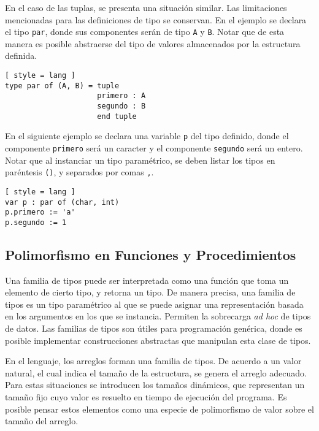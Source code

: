 En el caso de las tuplas, se presenta una situación similar.
Las limitaciones mencionadas para las definiciones de tipo se conservan.
En el ejemplo se declara el tipo \lstinline[style = lang]{par}, donde sus componentes serán de tipo \lstinline[style = lang]{A} y \lstinline[style = lang]{B}.
Notar que de esta manera es posible abstraerse del tipo de valores almacenados por la estructura definida.

\begin{lstlisting}[ style = lang ]
type par of (A, B) = tuple
                     primero : A
                     segundo : B
                     end tuple
\end{lstlisting}

En el siguiente ejemplo se declara una variable \lstinline[style = lang]{p} del tipo definido, donde el componente \lstinline[style = lang]{primero} será un caracter y el componente \lstinline[style = lang]{segundo} será un entero.
Notar que al instanciar un tipo paramétrico, se deben listar los tipos en paréntesis \lstinline[style = lang]{()}, y separados por comas \lstinline[style = lang]{,}.

\begin{lstlisting}[ style = lang ]
var p : par of (char, int)
p.primero := 'a'
p.segundo := 1
\end{lstlisting}

\subsection{Polimorfismo en Funciones y Procedimientos}

Una familia de tipos puede ser interpretada como una función que toma un elemento de cierto tipo, y retorna un tipo.
De manera precisa, una familia de tipos es un tipo paramétrico al que se puede asignar una representación basada en los argumentos en los que se instancia.
Permiten la sobrecarga \textit{ad hoc} de tipos de datos.
Las familias de tipos son útiles para programación genérica, donde es posible implementar construcciones abstractas que manipulan esta clase de tipos.

En el lenguaje, los arreglos forman una familia de tipos.
De acuerdo a un valor natural, el cual indica el tamaño de la estructura, se genera el arreglo adecuado.
Para estas situaciones se introducen los tamaños dinámicos, que representan un tamaño fijo cuyo valor es resuelto en tiempo de ejecución del programa.
Es posible pensar estos elementos como una especie de polimorfismo de valor sobre el tamaño del arreglo.

